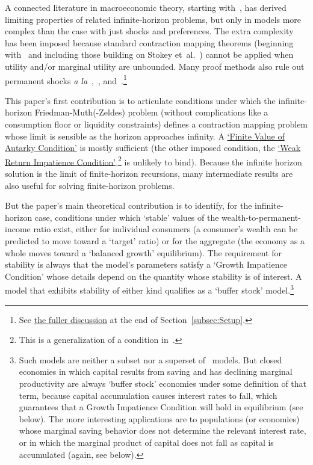 \documentclass[ProjectDLO]{subfiles}
\begin{document}
A connected literature in macroeconomic theory, starting with~\cite{bewleyPIH}, has derived limiting properties of related infinite-horizon problems, but only in models more complex than the case with just shocks and preferences. The extra complexity has been imposed because standard contraction mapping theorems (beginning with~\cite{bellmanDynamicProgramming} and including those building on Stokey et~al.~\citeyearpar{slpMethods}) cannot be applied when utility and/or marginal utility are unbounded. Many proof methods also rule out permanent shocks \textit{a la}~\cite{friedmanATheory},~\cite{muthOptimal}, and~\cite{zeldesStochastic}.\footnote{See \hyperlink{DiffFromLit}{the fuller discussion} at the end of Section~\ref{subsec:Setup}.}

This paper's first contribution is to articulate conditions under which the infinite-horizon Friedman-Muth(-Zeldes) problem (without complications like a consumption floor or liquidity constraints) defines a contraction mapping problem whose limit is sensible as the horizon approaches infinity.  A \hyperlink{FVAC}{`Finite Value of Autarky Condition'} is mostly sufficient (the other imposed condition, the \hyperlink{WRIC}{`Weak Return Impatience Condition'},\footnote{This is a generalization of a condition in~\cite{mstIncFluct}.} is unlikely to bind).  Because the infinite horizon solution is the limit of finite-horizon recursions, many intermediate results are also useful for solving finite-horizon problems.

But the paper's main theoretical contribution is to identify, for the infinite-horizon case, conditions under which `stable' values of the wealth-to-permanent-income ratio exist, either for individual consumers (a consumer's wealth can be predicted to move toward a `target' ratio) or for the aggregate (the economy as a whole moves toward a `balanced growth' equilibrium).  The requirement for stability is always that the model's parameters satisfy a `Growth Impatience Condition' whose details depend on the quantity whose stability is of interest.  A model that exhibits stability of either kind qualifies as a `buffer stock' model.\footnote{Such models are neither a subset nor a superset of~\cite{bewleyPIH} models.  But closed economies in which capital results from saving and has declining marginal productivity are always `buffer stock' economies under some definition of that term, because capital accumulation causes interest rates to fall, which guarantees that a Growth Impatience Condition will hold in equilibrium (see below).  The more interesting applications are to populations (or economies) whose marginal saving behavior does not determine the relevant interest rate, or in which the marginal product of capital does not fall as capital is accumulated (again, see below).}
\end{document}
